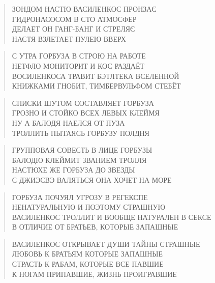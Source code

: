 \poemtitle{***}
\begin{verse}
ЗОНДОМ НАСТЮ ВАСИЛЕНКОС ПРОНЗАЄ\\
ГИДРОНАСОСОМ В СТО АТМОСФЕР\\
ДЕЛАЕТ ОН ГАНГ-БАНГ И СТРЕЛЯЄ\\
НАСТЯ ВЗЛЕТАЕТ ПУЛЕЮ ВВЕРХ
\end{verse}

\poemtitle{***}
\begin{verse}
С УТРА ГОРБУЗА В СТРОЮ НА РАБОТЕ\\
НЕТФЛО МОНИТОРИТ И КОС РАЗДАЁТ\\
ВОСИЛЕНКОСА ТРАВИТ БЭТЛТЕКА ВСЕЛЕННОЙ\\
КНИЖКАМИ ГНОБИТ, ТИМБЕРВУЛЬФОМ СТЕБЁТ
\end{verse}

\poemtitle{***}
\begin{verse}
СПИСКИ ШУТОМ СОСТАВЛЯЕТ ГОРБУЗА\\
ГРОЗНО И СТОЙКО ВСЕХ ЛЕВЫХ КЛЕЙМЯ\\
НУ А БАЛОДЯ НАЕЛСЯ ОТ ПУЗА\\
ТРОЛЛИТЬ ПЫТАЯСЬ ГОРБУЗУ ПОЛДНЯ
\end{verse}

\poemtitle{***}
\begin{verse}
ГРУППОВАЯ СОВЕСТЬ В ЛИЦЕ ГОРБУЗЫ \\
БАЛОДЮ КЛЕЙМИТ ЗВАНИЕМ ТРОЛЛЯ\\
НАСТЮХЕ ЖЕ ГОРБУЗА ДО ЗВЕЗДЫ\\
С ДЖИЭСВЭ ВАЛЯТЬСЯ ОНА ХОЧЕТ НА МОРЕ
\end{verse}

\poemtitle{***}
\begin{verse}
ГОРБУЗА ПОЧУЯЛ УГРОЗУ В РЕГЕКСПЕ\\
НЕНАТУРАЛЬНУЮ И ПОЭТОМУ СТРАШНУЮ\\
ВАСИЛЕНКОС ТРОЛЛИТ И ВООБЩЕ НАТУРАЛЕН В СЕКСЕ\\
В ОТЛИЧИЕ ОТ БРАТЬЕВ, КОТОРЫЕ ЗАПАШНЫЕ
\end{verse}

\poemtitle{***}
\begin{verse}
ВАСИЛЕНКОС ОТКРЫВАЕТ ДУШИ ТАЙНЫ СТРАШНЫЕ\\
ЛЮБОВЬ К БРАТЬЯМ КОТОРЫЕ ЗАПАШНЫЕ\\
СТРАСТЬ К РАБАМ, КОТОРЫЕ ВСЕ ПАВШИЕ\\
К НОГАМ ПРИПАВШИЕ, ЖИЗНЬ ПРОИГРАВШИЕ
\end{verse}

